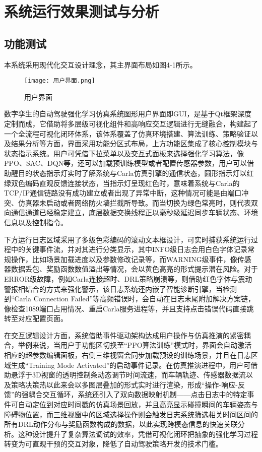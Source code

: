 

\chapter{系统运行效果测试与分析}
\section{功能测试}
本系统采用现代化交互设计理念，其主界面布局如图4-1所示。


\begin{figure}[hbt]
	\centering
	\texttt{[image: 用户界面.png]}
	\caption{用户界面}
	\label{f.example}
\end{figure}

数字孪生的自动驾驶强化学习仿真系统图形用户界面即GUI，是基于Qt框架深度定制而成，它借助将多层级可视化组件和高响应交互逻辑进行无缝融合，构建起了一个全流程可视化闭环体系，该体系覆盖了仿真环境搭建、算法训练、策略验证以及结果分析等方面，界面采用功能分区式布局，上方功能区集成了核心控制模块与状态指示系统。用户可凭借下拉菜单以及交互式面板来选择强化学习算法，像PPO、SAC、DQN等，还可以加载预训练模型或者配置传感器参数，用户可以借助醒目的状态指示灯实时了解系统与Carla仿真引擎的通信状态，圆形指示灯以红绿双色编码直观反馈连接状态，当指示灯呈现红色时，意味着系统与Carla的TCP/IP通信链路没有成功建立或者出现了异常中断，这种情况可能是由端口冲突、仿真器未启动或者网络防火墙拦截所导致。而当切换为绿色常亮时，则代表双向通信通道已经稳定建立，底层数据交换线程正以毫秒级延迟同步车辆状态、环境信息以及控制指令。

下方运行日志区域采用了多级色彩编码的滚动文本框设计，可实时捕获系统运行过程中的关键事件流，并对其进行分类显示，其中INFO级日志会用白色字体记录常规操作，比如场景加载进度以及参数修改记录等，而WARNING级事件，像传感器数据丢包、奖励函数数值溢出等情况，会以黄色高亮的形式提示潜在风险。对于ERROR级故障，例如Carla连接超时、DRL策略崩溃等，则借助红色字体与震动警报相结合的方式来强化警示，该日志系统还内嵌了智能诊断引擎，当检测到“Carla Connection Failed”等高频错误时，会自动在日志末尾附加解决方案链，像检查1089端口占用情况、重启Carla服务进程等，并且支持点击错误代码直接跳转至对应配置页面。

在交互逻辑设计方面，系统借助事件驱动架构达成用户操作与仿真推演的紧密耦合，举例来说，当用户于功能区切换至“PPO算法训练”模式时，界面会自动激活相应的超参数编辑面板，右侧三维视窗会同步加载预设的训练场景，并且在日志区域生成“Training Mode Activated”的启动事件记录。在仿真推演进程中，用户可借助悬浮于3D视窗的透明控制条动态调节时间流速，而车辆轨迹、传感器数据流以及策略决策热以此来会以多图层叠加的形式实时进行渲染，形成“操作-响应-反馈”的强耦合交互循环，系统还引入了双向数据映射机制——点击日志中的特定事件可自动定位到对应时间戳的仿真场景回放，并且高亮显示碰撞瞬间的车辆姿态与障碍物位置，而三维视窗中的区域选择操作则会触发日志系统筛选相关时间区间的所有DRL动作分布与奖励函数构成的数据，以此实现跨模态信息的快速关联分析。这种设计提升了复杂算法调试的效率，凭借可视化闭环把抽象的强化学习过程转变为可直观干预的交互对象，降低了自动驾驶策略开发的技术门槛。

